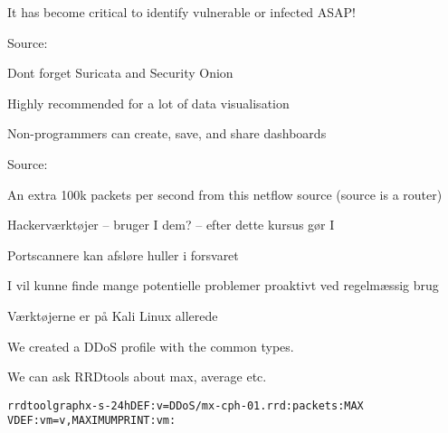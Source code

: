 \documentclass[20pt,landscape,a4paper,footrule]{foils}
\begin{document}
\vskip 1cm

\centerline{It has become critical to identify vulnerable or infected ASAP!}

Source:
{\tiny{}}

Dont forget Suricata  and Security Onion\\ {\small{}}



\centerline{Highly recommended for a lot of data visualisation}

Non-programmers can create, save, and share dashboards

Source:





\centerline{An extra 100k packets per second from this netflow source (source is a router)}

\begin{list1}
\item Hackerværktøjer -- bruger I dem? -- efter dette kursus gør I
\item Portscannere kan afsløre huller i forsvaret
\item I vil kunne finde mange potentielle problemer proaktivt ved
  regelmæssig brug
\end{list1}

\centerline{Værktøjerne er på Kali Linux allerede}



We created a DDoS profile with the common types.

We can ask RRDtools about max, average etc.
\begin{alltt}\small
rrdtool graph x -s -24h DEF:v=DDoS/mx-cph-01.rrd:packets:MAX
VDEF:vm=v,MAXIMUM PRINT:vm:%.lf
\end{alltt}




\end{document}
